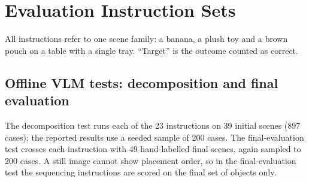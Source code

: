 \chapter{Evaluation Instruction Sets}
\label{app:instructions}
All instructions refer to one scene family: a banana, a plush toy and a brown pouch on a
table with a single tray. ``Target'' is the outcome counted as correct.

\section{Offline VLM tests: decomposition and final evaluation}
\label{app:instr-offline}
The decomposition test runs each of the 23 instructions on 39 initial
scenes (897 cases); the reported results use a seeded sample of
200 cases. The final-evaluation test crosses each instruction with
49 hand-labelled final scenes, again sampled to 200 cases. A
still image cannot show placement order, so in the final-evaluation test the sequencing
instructions are scored on the final set of objects only.
